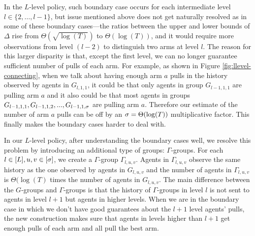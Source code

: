 
In the $L$-level policy, such boundary case occurs for each
intermediate level $l\in \{2, \ldots, l-1\}$, but issue mentioned
above does not get naturally resolved as in some of these boundary
cases---the ratios between the upper and lower bounds of $\Delta$ rise
from $\Theta(\sqrt{\log(T)})$ to $\Theta(\log(T))$, and it would
require more observations from level $(l-2)$ to distinguish two arms
at level $l$. The reason for this larger disparity is that, except the
first level, we can no longer guarantee sufficient number of pulls of
each arm. For example, as shown in Figure \ref{fig:llevel-connecting},
when we talk about having enough arm $a$ pulls in the history observed
by agents in $G_{l,1,1}$, it could be that only agents in group
$G_{l-1,1,1}$ are pulling arm $a$ and it also could be that most
agents in groups $G_{l-1,1,1},G_{l-1,1,2},...,G_{l-1,1,\sigma}$ are
pulling arm $a$. Therefore our estimate of the number of arm $a$ pulls
can be off by an $\sigma=\Theta(\log(T))$ multiplicative factor. This
finally makes the boundary cases harder to deal with.

In our $L$-level policy, after understanding the boundary cases well, we resolve this problem by introducing an additional type of groups: $\Gamma$-groups. For each $l \in [L], u,v \in [\sigma]$, we create a $\Gamma$-group $\Gamma_{l,u,v}$. Agents in $\Gamma_{l,u,v}$ observe the same history as the one observed by agents in $G_{l,u,v}$ and the number of agents in $\Gamma_{l,u,v}$ is $\Theta(\log(T)$ times the number of agents in $G_{l,u,v}$. The main difference between the $G$-groups and $\Gamma$-groups is that the history of $\Gamma$-groups in level $l$ is not sent to agents in level $l+1$ but agents in higher levels. When we are in the boundary case in which we don't have good guarantees about the $l+1$ level agents' pulls, the new construction makes sure that agents in levels higher than $l+1$ get enough pulls of each arm and all pull the best arm. 
